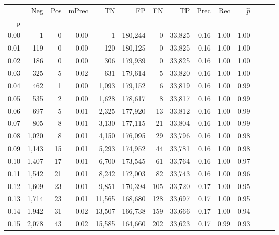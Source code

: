\begin{tabular}{rrrrrrrrrrrrrr}
\toprule
{} &    Neg &  Pos & mPrec &       TN &       FP &      FN &      TP &  Prec &   Rec & $\hat{p}$ \\
p    &        &      &       &          &          &         &         &       &       &           \\
\midrule
0.00 &      1 &    0 &  0.00 &        1 &  180,244 &       0 &  33,825 &  0.16 &  1.00 &      1.00 \\
0.01 &    119 &    0 &  0.00 &      120 &  180,125 &       0 &  33,825 &  0.16 &  1.00 &      1.00 \\
0.02 &    186 &    0 &  0.00 &      306 &  179,939 &       0 &  33,825 &  0.16 &  1.00 &      1.00 \\
0.03 &    325 &    5 &  0.02 &      631 &  179,614 &       5 &  33,820 &  0.16 &  1.00 &      1.00 \\
0.04 &    462 &    1 &  0.00 &    1,093 &  179,152 &       6 &  33,819 &  0.16 &  1.00 &      0.99 \\
0.05 &    535 &    2 &  0.00 &    1,628 &  178,617 &       8 &  33,817 &  0.16 &  1.00 &      0.99 \\
0.06 &    697 &    5 &  0.01 &    2,325 &  177,920 &      13 &  33,812 &  0.16 &  1.00 &      0.99 \\
0.07 &    805 &    8 &  0.01 &    3,130 &  177,115 &      21 &  33,804 &  0.16 &  1.00 &      0.99 \\
0.08 &  1,020 &    8 &  0.01 &    4,150 &  176,095 &      29 &  33,796 &  0.16 &  1.00 &      0.98 \\
0.09 &  1,143 &   15 &  0.01 &    5,293 &  174,952 &      44 &  33,781 &  0.16 &  1.00 &      0.98 \\
0.10 &  1,407 &   17 &  0.01 &    6,700 &  173,545 &      61 &  33,764 &  0.16 &  1.00 &      0.97 \\
0.11 &  1,542 &   21 &  0.01 &    8,242 &  172,003 &      82 &  33,743 &  0.16 &  1.00 &      0.96 \\
0.12 &  1,609 &   23 &  0.01 &    9,851 &  170,394 &     105 &  33,720 &  0.17 &  1.00 &      0.95 \\
0.13 &  1,714 &   23 &  0.01 &   11,565 &  168,680 &     128 &  33,697 &  0.17 &  1.00 &      0.95 \\
0.14 &  1,942 &   31 &  0.02 &   13,507 &  166,738 &     159 &  33,666 &  0.17 &  1.00 &      0.94 \\
0.15 &  2,078 &   43 &  0.02 &   15,585 &  164,660 &     202 &  33,623 &  0.17 &  0.99 &      0.93 \\

\end{tabular}
